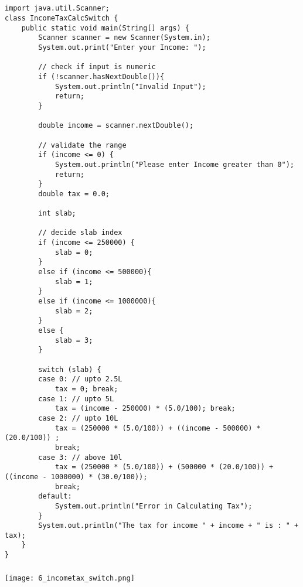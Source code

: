 \documentclass[12pt,a4paper]{article}
\begin{document}
\subsection{}
\begin{lstlisting}
import java.util.Scanner;
class IncomeTaxCalcSwitch {
    public static void main(String[] args) {
        Scanner scanner = new Scanner(System.in);
        System.out.print("Enter your Income: ");
    
        // check if input is numeric
        if (!scanner.hasNextDouble()){
            System.out.println("Invalid Input");
            return;
        }
    
        double income = scanner.nextDouble();
    
        // validate the range
        if (income <= 0) {
            System.out.println("Please enter Income greater than 0");
            return;
        }
        double tax = 0.0;
    
        int slab;
    
        // decide slab index
        if (income <= 250000) {
            slab = 0;
        }
        else if (income <= 500000){
            slab = 1;
        }
        else if (income <= 1000000){
            slab = 2;
        }
        else {
            slab = 3;
        }
    
        switch (slab) {
        case 0: // upto 2.5L
            tax = 0; break;
        case 1: // upto 5L
            tax = (income - 250000) * (5.0/100); break;
        case 2: // upto 10L
            tax = (250000 * (5.0/100)) + ((income - 500000) * (20.0/100)) ;
            break;
        case 3: // above 10l
            tax = (250000 * (5.0/100)) + (500000 * (20.0/100)) + ((income - 1000000) * (30.0/100));
            break;
        default:
            System.out.println("Error in Calculating Tax");
        }
        System.out.println("The tax for income " + income + " is : " + tax);
    }
}
\end{lstlisting}

\subsubsection{}
\begin{center}
    \texttt{[image: 6\_incometax\_switch.png]}
\end{center}
\end{document}
